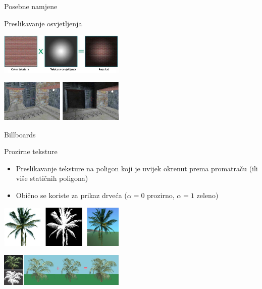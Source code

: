 \documentclass[9pt]{beamer}
\begin{document}
\begin{frame}{Posebne namjene}
	\begin{block}{Preslikavanje osvjetljenja}
		\begin{center}
			\includegraphics[width=6cm]{slike/teksture_light.png}
		\end{center}
		\begin{center}
			\includegraphics[width=6cm]{slike/teksture_light_02.png}
		\end{center}
	\end{block}
\end{frame}
%
\begin{frame}{Billboards}
	\begin{block}{Prozirne teksture}
		\begin{itemize}
			\item Preslikavanje teksture na poligon koji je uvijek okrenut prema promatraču (ili više
			statičnih poligona)
			\item Obično se koriste za prikaz drveća ($\alpha=0$ prozirno, $\alpha=1$ zeleno)
		\end{itemize}
	\end{block}
	\begin{center}
		\includegraphics[width=6cm]{slike/teksture_billboards_01.png}
	\end{center}
	\begin{center}
		\includegraphics[width=6cm]{slike/teksture_billboards_02.png}
	\end{center}
\end{frame}
%
\end{document}
